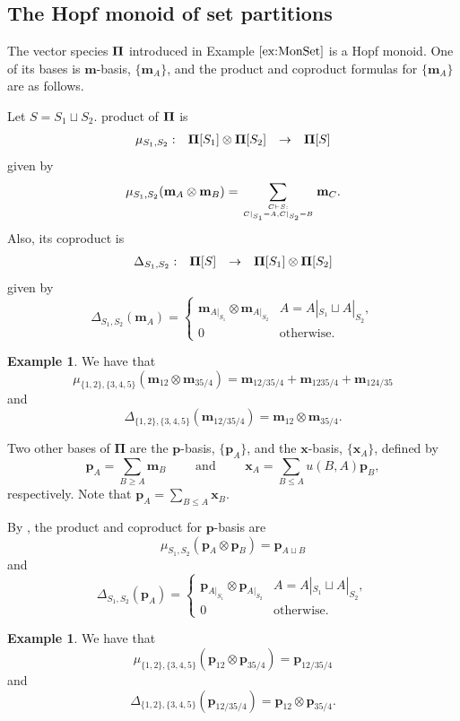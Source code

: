 \documentclass[12pt]{amsart}  %
\theoremstyle{definition}
\newtheorem{example}[theorem]{Example}
\theoremstyle{remark}
\numberwithin{equation}{section}
\newcommand{\mhm}{\mathbf{m}}           	%
\newcommand{\phm}{\mathbf{p}}                %
\newcommand{\xhm}{\mathbf{x}}
\newcommand{\bPi}{{\mathbf{\Pi}}}
\newcommand{\mymu}{{u}}
\newcommand\svw[1]{{\color{black}{#1}}}
\begin{document}
\subsection{The Hopf monoid of set partitions}
The vector species ${\bf \Pi}$ introduced in Example $\ref{ex:MonSet}$ is a Hopf monoid. One of its bases is \svw{the} $\mhm$-basis, $\{\mhm_A\}$, and the product and coproduct formulas for $\{\mhm_A\}$ are as follows.  



Let $S=S_1\sqcup S_2$. \svw{Then the} product of ${\bf \Pi}$ is
$$
\begin{array}{cccc}
\mu_{S_1,S_2}:&  {\bf \Pi}[S_1] \otimes {\bf \Pi}[S_2] & \rightarrow & {\bf \Pi}[S]
\end{array} 
$$
 given by 
$$\mu_{S_1,S_2}(\mhm_{A} \otimes \mhm_{B})=\sum_{C\vdash S: \atop{ C|_{S_1}=A, C|_{S_2}=B}} \mhm_C.$$
Also, its coproduct is
$$
\begin{array}{cccc}
\Delta_{S_1,S_2}:& {\bf \Pi}[S]& \rightarrow  & {\bf \Pi}[S_1] \otimes {\bf \Pi}[S_2] 
\end{array} 
$$
given by 
$$\Delta_{S_1,S_2}(\mhm_A)=\begin{cases}
\mhm_{A|_{S_1}} \otimes \mhm_{A|_{S_2}} & A=A|_{S_1}\sqcup A|_{S_2},\\
0 & \text{otherwise.}
\end{cases}$$
\begin{example}
We have that 
$$\mu_{\{1,2\},\{3,4,5\}}(\mhm_{12} \otimes \mhm_{35/4})=\mhm_{12/35/4}+\mhm_{1235/4}+\mhm_{124/35}$$
and 
$$\Delta_{\{1,2\},\{3,4,5\}}(\mhm_{12/35/4})=\mhm_{12}\otimes \mhm_{35/4}.$$
\end{example}




Two other bases of $\bPi$ are the $\phm$-basis, $\{\phm_A\}$, and the $\xhm$-basis, $\{\xhm_{A}\}$, defined by 
$$\phm_A=\sum_{B\geq A} \mhm_B\quad\quad\text{~and~}\quad \quad \xhm_A=\sum_{B\leq A} \mymu(B,A) \phm_B,$$ respectively. Note that $\phm_A=\sum_{B\leq A} \xhm_B.$

By \cite[Section 1.3]{BB}, the product and coproduct for \svw{the} $\phm$-basis are
$$\mu_{S_1,S_2}(\phm_A\otimes \phm_B)=\phm_{A\sqcup B}$$ and 
\begin{equation}\label{eq:cop-pi}
\Delta_{S_1,S_2}(\phm_A)=\begin{cases}
\phm_{A|_{S_1}} \otimes \phm_{A|_{S_2}} & A=A|_{S_1}\sqcup A|_{S_2},\\
0 & \text{otherwise.}
\end{cases} 
\end{equation} 
\begin{example}
We have that 
$$\mu_{\{1,2\},\{3,4,5\}}(\phm_{12} \otimes \phm_{35/4})=\phm_{12/35/4}$$
and 
$$\Delta_{\{1,2\},\{3,4,5\}}(\phm_{12/35/4})=\phm_{12}\otimes \phm_{35/4}.$$
\end{example}
\end{document}
